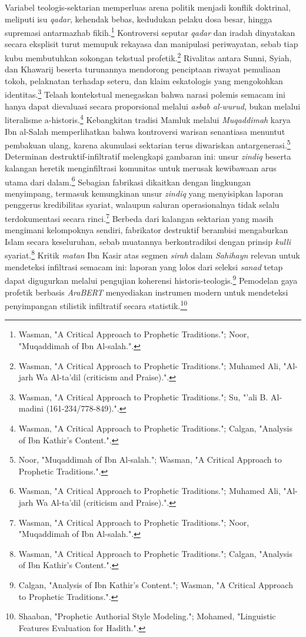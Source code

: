 Variabel teologis-sektarian memperluas arena politik menjadi konflik doktrinal, meliputi isu \textit{qadar}, kehendak bebas, kedudukan pelaku dosa besar, hingga supremasi antarmazhab fikih.\footnote{Wasman, "A Critical Approach to Prophetic Traditions."; Noor, "Muqaddimah of Ibn Al-salah.".} Kontroversi seputar \textit{qadar} dan iradah dinyatakan secara eksplisit turut memupuk rekayasa dan manipulasi periwayatan, sebab tiap kubu membutuhkan sokongan tekstual profetik.\footnote{Wasman, "A Critical Approach to Prophetic Traditions."; Muhamed Ali, "Al-jarh Wa Al-ta'dil (criticism and Praise).".} Rivalitas antara Sunni, Syiah, dan Khawarij beserta turunannya mendorong penciptaan riwayat pemuliaan tokoh, pelaknatan terhadap seteru, dan klaim eskatologis yang mengokohkan identitas.\footnote{Wasman, "A Critical Approach to Prophetic Traditions."; Su, "'ali B. Al-madini (161-234/778-849).".} Telaah kontekstual menegaskan bahwa narasi polemis semacam ini hanya dapat dievaluasi secara proporsional melalui \textit{asbab al-wurud}, bukan melalui literalisme a-historis.\footnote{Wasman, "A Critical Approach to Prophetic Traditions."; Calgan, "Analysis of Ibn Kathir's Content.".} Kebangkitan tradisi Mamluk melalui \textit{Muqaddimah} karya Ibn al-Salah memperlihatkan bahwa kontroversi warisan senantiasa menuntut pembakuan ulang, karena akumulasi sektarian terus diwariskan antargenerasi.\footnote{Noor, "Muqaddimah of Ibn Al-salah."; Wasman, "A Critical Approach to Prophetic Traditions.".} Determinan destruktif-infiltratif melengkapi gambaran ini: unsur \textit{zindiq} beserta kalangan heretik menginfiltrasi komunitas untuk merusak kewibawaan arus utama dari dalam.\footnote{Wasman, "A Critical Approach to Prophetic Traditions."; Muhamed Ali, "Al-jarh Wa Al-ta'dil (criticism and Praise).".} Sebagian fabrikasi dikaitkan dengan lingkungan menyimpang, termasuk kemungkinan unsur \textit{zindiq} yang menyisipkan laporan penggerus kredibilitas syariat, walaupun saluran operasionalnya tidak selalu terdokumentasi secara rinci.\footnote{Wasman, "A Critical Approach to Prophetic Traditions."; Noor, "Muqaddimah of Ibn Al-salah.".} Berbeda dari kalangan sektarian yang masih mengimani kelompoknya sendiri, fabrikator destruktif berambisi mengaburkan Islam secara keseluruhan, sebab muatannya berkontradiksi dengan prinsip \textit{kulli} syariat.\footnote{Wasman, "A Critical Approach to Prophetic Traditions."; Calgan, "Analysis of Ibn Kathir's Content.".} Kritik \textit{matan} Ibn Kasir atas segmen \textit{sirah} dalam \textit{Sahihayn} relevan untuk mendeteksi infiltrasi semacam ini: laporan yang lolos dari seleksi \textit{sanad} tetap dapat digugurkan melalui pengujian koherensi historis-teologis.\footnote{Calgan, "Analysis of Ibn Kathir's Content."; Wasman, "A Critical Approach to Prophetic Traditions.".} Pemodelan gaya profetik berbasis \textit{AraBERT} menyediakan instrumen modern untuk mendeteksi penyimpangan stilistik infiltratif secara statistik.\footnote{Shaaban, "Prophetic Authorial Style Modeling."; Mohamed, "Linguistic Features Evaluation for Hadith.".}

